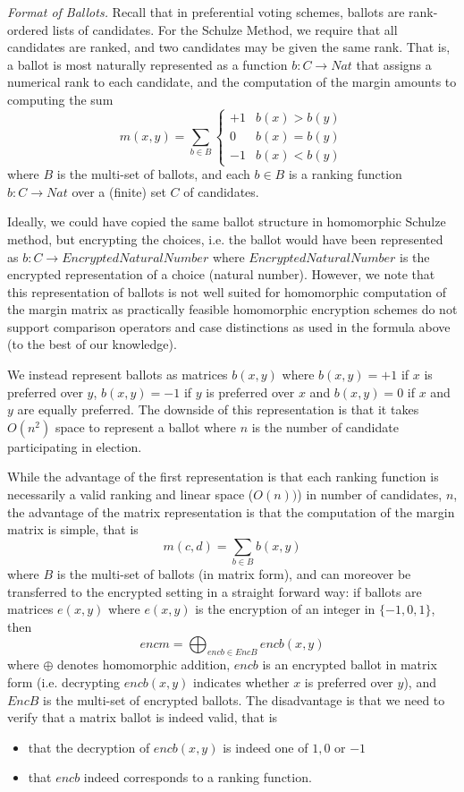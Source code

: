 \smallskip\noindent\emph{Format of Ballots.} Recall that in preferential voting
schemes, ballots are rank-ordered lists of candidates. For the
Schulze Method, we require that all candidates are ranked, and two
candidates may be given the same rank. That is, a ballot is most
naturally represented as a function $b: C \to Nat$ that assigns a
numerical rank to each candidate, and the computation of the margin
amounts to computing the sum
\[ m(x, y) = \sum_{b \in B} \begin{cases} +1 & b(x) > b(y) \\ 0 &
b(x) = b(y) \\ -1 & b(x) < b(y) \end{cases} \]
where $B$ is the multi-set of ballots, and each $b \in B$ is a
ranking function $b: C \to Nat$ over a (finite) set $C$ of
candidates. 

Ideally, we could have copied the same ballot structure in homomorphic Schulze method, 
but encrypting the choices, i.e. the ballot would have been represented as $b: C \to EncryptedNaturalNumber$
where $EncryptedNaturalNumber$ is the encrypted representation of a choice (natural number).
However, we note that this representation of ballots is not well suited for
homomorphic computation of the margin matrix as practically feasible
homomorphic encryption schemes do not support comparison operators
and case distinctions as used in the formula above (to the best of our knowledge).

We instead represent ballots as matrices
$b(x, y)$ where $b(x, y) = +1$ if $x$ is preferred
over $y$, $b(x, y) = -1$ if $y$ is preferred over $x$ and $b(x, y) =
0$ if $x$ and $y$ are equally preferred. The downside of this representation 
is that it takes $O(n^2)$ space to represent a ballot where $n$ is the number 
of candidate participating in election. 

While the advantage of the first representation is that each ranking
function is necessarily a valid ranking and linear space ($O(n))$) in number 
of candidates, $n$, the advantage of the matrix 
representation is that the computation of
the margin matrix is simple, that is
\[ m(c, d) = \sum_{b \in B} b(x, y) \]
where $B$ is the multi-set of ballots (in matrix form), and can
moreover be transferred to the encrypted setting in a straight
forward way: if ballots are matrices $e(x,y)$ where $e(x,y)$ is the
encryption of an integer in $\lbrace -1, 0, 1 \rbrace$, then
\begin{equation}\label{eqn:enc-mm}
encm = \bigoplus_{encb \in EncB} encb(x, y) 
\end{equation}
where $\oplus$ denotes homomorphic addition, $encb$ is an encrypted
ballot in matrix form (i.e. decrypting $encb(x, y)$ indicates
whether $x$ is preferred over $y$), and $EncB$ is the multi-set of
encrypted ballots. The disadvantage is that we need to verify that a
matrix ballot is indeed valid, that is
\begin{itemize}
\item that the decryption of $encb(x, y)$ is indeed one of $1, 0$ or
$-1$
\item that $encb$ indeed corresponds to a ranking function.
\end{itemize}

